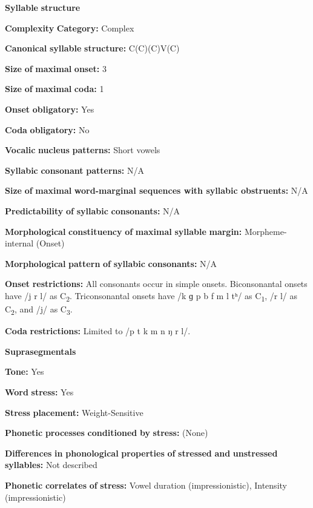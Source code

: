 \begin{styleBody}
\textbf{Syllable} \textbf{structure}

\textbf{Complexity} \textbf{Category:} Complex

\textbf{Canonical} \textbf{syllable} \textbf{structure:} C(C)(C)V(C) \citep[30-32]{Plaisier2007}

\textbf{Size} \textbf{of} \textbf{maximal} \textbf{onset:} 3

\textbf{Size} \textbf{of} \textbf{maximal} \textbf{coda:} 1

\textbf{Onset} \textbf{obligatory:} Yes

\textbf{Coda} \textbf{obligatory:} No

\textbf{Vocalic} \textbf{nucleus} \textbf{patterns:} Short vowels

\textbf{Syllabic} \textbf{consonant} \textbf{patterns:} N/A

\textbf{Size} \textbf{of} \textbf{maximal} \textbf{word{}-marginal sequences with syllabic obstruents:} N/A

\textbf{Predictability} \textbf{of} \textbf{syllabic} \textbf{consonants:} N/A

\textbf{Morphological} \textbf{constituency} \textbf{of} \textbf{maximal} \textbf{syllable} \textbf{margin:} Morpheme-internal (Onset)

\textbf{Morphological} \textbf{pattern} \textbf{of} \textbf{syllabic} \textbf{consonants:} N/A

\textbf{Onset} \textbf{restrictions:} All consonants occur in simple onsets. Biconsonantal onsets have /j r l/ as C\textsubscript{2}. Triconsonantal onsets have /k ɡ p b f m l tʰ/ as C\textsubscript{1}, /r l/ as C\textsubscript{2}, and /j/ as C\textsubscript{3}.

\textbf{Coda} \textbf{restrictions:} Limited to /p t k m n ŋ r l/.

\textbf{Suprasegmentals}

\textbf{Tone:} Yes

\textbf{Word} \textbf{stress:} Yes

\textbf{Stress} \textbf{placement:} Weight-Sensitive

\textbf{Phonetic} \textbf{processes} \textbf{conditioned} \textbf{by} \textbf{stress:} (None)

\textbf{Differences} \textbf{in} \textbf{phonological} \textbf{properties} \textbf{of} \textbf{stressed} \textbf{and} \textbf{unstressed} \textbf{syllables:} Not described

\textbf{Phonetic} \textbf{correlates} \textbf{of} \textbf{stress:} Vowel duration (impressionistic), Intensity (impressionistic)


\end{styleBody}
